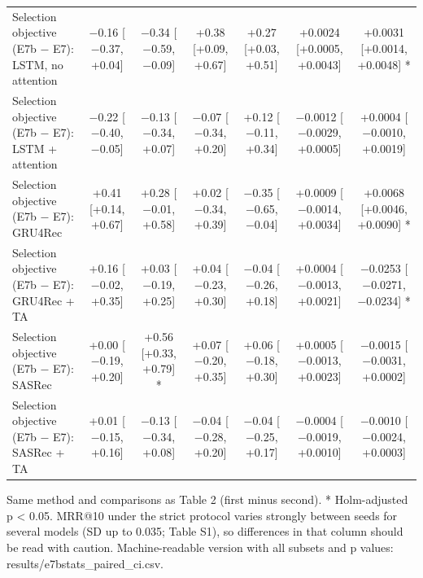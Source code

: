 \begin{table}[t]
\begin{tabular}{lcccccc}
Selection objective (E7b $-$ E7): LSTM, no attention & $-$0.16 [$-$0.37, +0.04] & $-$0.34 [$-$0.59, $-$0.09] & +0.38 [+0.09, +0.67] & +0.27 [+0.03, +0.51] & +0.0024 [+0.0005, +0.0043] & +0.0031 [+0.0014, +0.0048] * \\
Selection objective (E7b $-$ E7): LSTM + attention & $-$0.22 [$-$0.40, $-$0.05] & $-$0.13 [$-$0.34, +0.07] & $-$0.07 [$-$0.34, +0.20] & +0.12 [$-$0.11, +0.34] & $-$0.0012 [$-$0.0029, +0.0005] & +0.0004 [$-$0.0010, +0.0019] \\
Selection objective (E7b $-$ E7): GRU4Rec & +0.41 [+0.14, +0.67] & +0.28 [$-$0.01, +0.58] & +0.02 [$-$0.34, +0.39] & $-$0.35 [$-$0.65, $-$0.04] & +0.0009 [$-$0.0014, +0.0034] & +0.0068 [+0.0046, +0.0090] * \\
Selection objective (E7b $-$ E7): GRU4Rec + TA & +0.16 [$-$0.02, +0.35] & +0.03 [$-$0.19, +0.25] & +0.04 [$-$0.23, +0.30] & $-$0.04 [$-$0.26, +0.18] & +0.0004 [$-$0.0013, +0.0021] & $-$0.0253 [$-$0.0271, $-$0.0234] * \\
Selection objective (E7b $-$ E7): SASRec & +0.00 [$-$0.19, +0.20] & +0.56 [+0.33, +0.79] * & +0.07 [$-$0.20, +0.35] & +0.06 [$-$0.18, +0.30] & +0.0005 [$-$0.0013, +0.0023] & $-$0.0015 [$-$0.0031, +0.0002] \\
Selection objective (E7b $-$ E7): SASRec + TA & +0.01 [$-$0.15, +0.16] & $-$0.13 [$-$0.34, +0.08] & $-$0.04 [$-$0.28, +0.20] & $-$0.04 [$-$0.25, +0.17] & $-$0.0004 [$-$0.0019, +0.0010] & $-$0.0010 [$-$0.0024, +0.0003] \\
\bottomrule
\end{tabular}
\par\smallskip\footnotesize Same method and comparisons as Table 2 (first minus second). * Holm-adjusted p < 0.05. MRR@10 under the strict protocol varies strongly between seeds for several models (SD up to 0.035; Table S1), so differences in that column should be read with caution. Machine-readable version with all subsets and p values: results/e7bstats\_paired\_ci.csv.
\end{table}